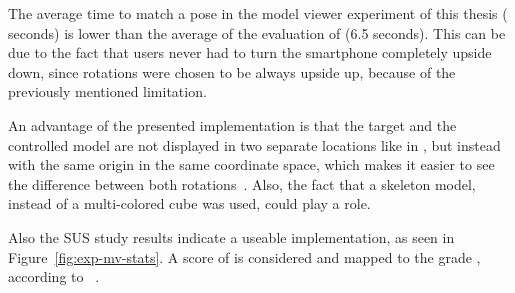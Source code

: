 The average time to match a pose in the model viewer experiment of this thesis (\evalExpMvAvgPoses{} seconds) is lower than the average of the evaluation of \citeauthor{Katzakis.2010} (6.5 seconds). This can be due to the fact that users never had to turn the smartphone completely upside down, since rotations were chosen to be always upside up, because of the previously mentioned limitation.

An advantage of the presented implementation is that the target and the controlled model are not displayed in two separate locations like in {}, but instead with the same origin in the same coordinate space, which makes it easier to see the difference between both rotations~\cite[140]{Katzakis.2010}. Also, the fact that a skeleton model, instead of a multi-colored cube was used, could play a role.

Also the \ac{SUS} study results indicate a useable implementation, as seen in Figure~\ref{fig:exp-mv-stats}. A score of \evalExpMvSusScore{} is considered \evalExpMvSusAdj{} and mapped to the grade \evalExpMvSusGrade, according to \citeauthor{Bangor.2009}~\cite[120\psq]{Bangor.2009}.

